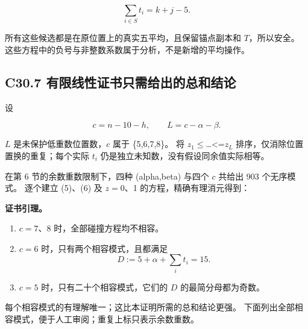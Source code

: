 \[
\sum_{i\in S}t_i=k+j-5.
\tag{C30.6}
\]

{所有这些候选都是在原位置上的真实五平均，且保留锚点副本和} {\ensuremath{T}，所以安全。} {这些方程中的负号与非整数系数属于分析，不是新增的平均操作。}

\subsection*{\texorpdfstring{{C30.7} {有限线性证书只需给出的总和结论}}{C30.7 有限线性证书只需给出的总和结论}}\label{C30-h197}

{设}

\[
c=n-10-h,\qquad L=c-\alpha-\beta.
\]

{\ensuremath{L}} {是未保护低重数位置数，\ensuremath{c}} {属于} {\{5,6,7,8\}。} {将} {\ensuremath{z_{1}\le }\ldots\textless=\ensuremath{z_{L}}} {排序，仅消除位置置换的重复；每个实际} {\ensuremath{t_{i}}} {仍是独立未知数，没有假设同余值实际相等。}

{在第} {6} {节的余数重数限制下，四种} {(alpha,beta)} {与四个} {\ensuremath{c}} {共给出} {903} {个无序模式。} {逐个建立} {(5)、(6)} {及} {\ensuremath{z=0}、1} {的方程，精确有理消元得到：}

\textbf{{证书引理。}}

\begin{enumerate}
\def\labelenumi{\arabic{enumi}.}
\tightlist
\item
  {\ensuremath{c=7}、8} {时，全部碰撞方程均不相容。}
\item
  {\ensuremath{c=6}} {时，只有两个相容模式，且都满足} \[
  D:=5+\alpha+\sum_i t_i=15.
  \tag{C30.7}
  \]
\item
  {\ensuremath{c=5}} {时，只有二十个相容模式，它们的} {\ensuremath{D}} {的最简分母都为奇数。}
\end{enumerate}

{每个相容模式的有理解唯一；这比本证明所需的总和结论更强。} {下面列出全部相容模式，便于人工审阅；重复上标只表示余数重数。}

